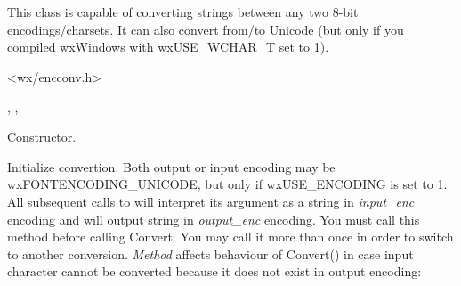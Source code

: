 %
%

\section{}\label{wxencodingconverter}

This class is capable of converting strings between any two
8-bit encodings/charsets. It can also convert from/to Unicode (but only
if you compiled wxWindows with wxUSE\_WCHAR\_T set to 1).




<wx/encconv.h>


, 
, 



\label{wxencodingconverterwxencodingconverter}


Constructor.

\label{wxencodingconverterinit}


Initialize convertion. Both output or input encoding may
be wxFONTENCODING\_UNICODE, but only if wxUSE\_ENCODING is set to 1.
All subsequent calls to  
will interpret its argument
as a string in {\it input\_enc} encoding and will output string in 
{\it output\_enc} encoding.
You must call this method before calling Convert. You may call 
it more than once in order to switch to another conversion.
{\it Method} affects behaviour of Convert() in case input character
cannot be converted because it does not exist in output encoding:

\begin{twocollist}\itemsep=0pt
\end{twocollist}

